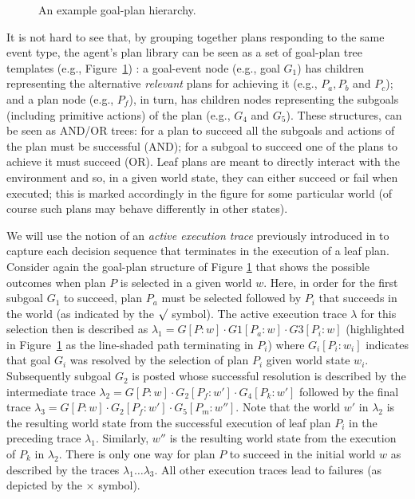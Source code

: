 \begin{figure}[t]
\begin{center}

\end{center}
\caption{An example goal-plan hierarchy.}
\label{fig:confidence}
\end{figure}

It is not hard to see that, by grouping together plans responding to the same event type, the agent's plan library can be seen as
a set of goal-plan tree templates (e.g., Figure~\ref{fig:confidence}) \cite{ShawBordini:AAMAS08}: a goal-event node (e.g., goal $G_1$) has children representing the alternative \emph{relevant} plans for achieving it (e.g., $P_a,P_b$ and $P_c$); and a plan node (e.g., $P_f$), in turn, has children nodes representing the subgoals (including primitive actions) of the plan (e.g., $G_4$ and $G_5$). These structures, can be seen as AND/OR trees: for a plan to succeed all the subgoals and actions of the plan must be successful (AND); for a subgoal to succeed one of the plans to achieve it must succeed (OR). Leaf plans are meant to directly interact with the environment and so, in a given world state, they can either succeed or fail when executed; this is marked accordingly in the figure for some particular world (of course such plans may behave differently in other states).

We will use the notion of an {\em active execution trace} previously introduced in \cite{singh10:learning} to capture each decision sequence that terminates in the execution of a leaf plan. Consider again the goal-plan structure of Figure \ref{fig:confidence} that shows the possible outcomes when plan $P$ is selected in a given world $w$. Here, in order for the first subgoal $G_1$ to succeed, plan $P_a$ must be selected followed by $P_i$ that succeeds in the world (as indicated by the $\surd$ symbol). The active execution trace $\lambda$ for this selection then is described as $\lambda_1=G[P:w] \cdot G1[P_a:w] \cdot G3[P_i:w]$ (highlighted in Figure~\ref{fig:confidence} as the line-shaded path terminating in $P_i$) where $G_i[P_i:w_i]$ indicates that goal $G_i$ was resolved by the selection of plan $P_i$ given world state $w_i$. Subsequently subgoal $G_2$ is posted whose successful resolution is described by the intermediate trace $\lambda_2=G[P:w] \cdot G_2[P_f:w'] \cdot G_4[P_k:w']$ followed by the final trace $\lambda_3=G[P:w] \cdot G_2[P_f:w'] \cdot G_5[P_m:w'']$. Note that the world $w'$ in $\lambda_2$ is the resulting world state from the successful execution of leaf plan $P_i$ in the preceding trace $\lambda_1$. Similarly, $w''$ is the resulting world state from the execution of $P_k$ in $\lambda_2$. There is only one way for plan $P$ to succeed in the initial world $w$ as described by the traces $\lambda_1 \ldots \lambda_3$. All other execution traces lead to failures (as depicted by the $\times$ symbol).

